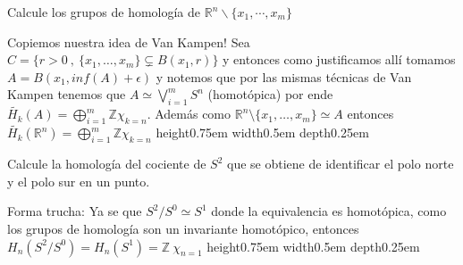 \documentclass[11pt,a4paper,oneside]{article}
\newcommand{\R}{{\mathbb{R}}}
\newcommand{\sett}[1]{\{#1\}}
\newcommand{\Z}{\mathbb{Z}}
\def \en{\end{enumerate}}
\newenvironment{proof}[1][Demostraci\'on]{\begin{trivlist}
\item[\hskip \labelsep {\bfseries #1}]}{\end{trivlist}}
\newcommand{\qed}{\nobreak \ifvmode \relax \else
      \ifdim\lastskip<1.5em \hskip-\lastskip
      \hskip1.5em plus0em minus0.5em \fi \nobreak
      \vrule height0.75em width0.5em depth0.25em\fi}
\begin{document}
\begin{enumerate}
\item Calcule los grupos de homolog\'ia de $\R^n\smallsetminus \{x_1, \cdots, x_m\}$

\begin{proof}

Copiemos nuestra idea de Van Kampen! Sea $C = \sett{r > 0 \ , \ \sett{x_1,\dots,x_m} \subsetneq B(x_1,r)}$ y entonces como justificamos all\'i tomamos $A = B(x_1 , inf(A) + \epsilon)$ y notemos que por las mismas t\'ecnicas de Van Kampen tenemos que $A \simeq \bigvee_{i=1}^{m} S^{n}$ (homot\'opica) por ende $\widetilde{H_k}(A) = \bigoplus_{i=1}^{m}{\Z \chi_{k=n}}$. Adem\'as como $\R^n \setminus \sett{x_1 , \dots , x_m} \simeq A $ entonces $\widetilde{H_k}(\R^n) = \bigoplus_{i=1}^{m}{\Z \chi_{k=n}}$ \qed


\end{proof}

\item Calcule la homolog\'ia del cociente de $S^2$ que se obtiene de identificar el polo norte y el polo sur en un punto.

\begin{proof}
Forma trucha: Ya se que $S^2 / S^0 \simeq S^1$ donde la equivalencia es homot\'opica, como los grupos de homolog\'ia son un invariante homot\'opico, entonces $H_n(S^2 / S^0) = H_n(S^1) = \Z \ \chi_{n=1}$ \qed
\end{proof}







\end{enumerate}
\end{document}
